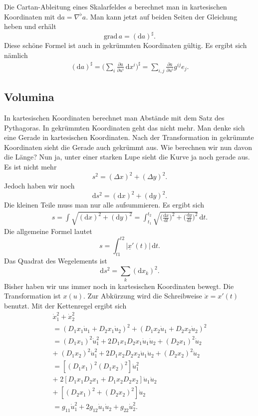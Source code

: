 \documentclass[a4paper,10pt,fleqn,twocolumn,twoside]{article}
\begin{document}
Die Cartan-Ableitung eines Skalarfeldes $a$ berechnet man in
kartesischen Koordinaten mit
$\mathrm da = \nabla^\flat a$. 
Man kann jetzt auf beiden Seiten der Gleichung heben und erhält
\[\mathrm{grad}\,a = (\mathrm da)^\sharp.\]
Diese schöne Formel ist auch in gekrümmten Koordinaten gültig.
Es ergibt sich nämlich
\begin{gather*}
(\mathrm da)^\sharp
= \Big(\sum_i \frac{\partial a}{\partial u^i}
\,\mathrm dx^i\Big)^\sharp
= \sum_{i,j} \frac{\partial a}{\partial u^i}g^{ij}e_j.
\end{gather*}

\subsection{Volumina}

In kartesischen Koordinaten berechnet man Abstände mit dem Satz des
Pythagoras. In gekrümmten Koordinaten geht das nicht mehr. Man denke
sich eine Gerade in kartesischen Koordinaten. Nach der Transformation
in gekrümmte Koordinaten sieht die Gerade auch gekrümmt aus. Wie
berechnen wir nun davon die Länge? Nun ja, unter einer starken Lupe
sieht die Kurve ja noch gerade aus. Es ist nicht mehr
\[s^2 = (\Delta x)^2+(\Delta y)^2.\]
Jedoch haben wir noch
\[\mathrm ds^2 = (\mathrm dx)^2+(\mathrm dy)^2.\]
Die kleinen Teile muss man nur alle aufsummieren. Es ergibt sich
\begin{gather*}
s = \int \sqrt{(\mathrm dx)^2+(\mathrm dy)^2}
= \int_{t_1}^{t_2}\sqrt{\Big(\frac{\mathrm dx}{\mathrm dt}\Big)^2
+\Big(\frac{\mathrm dy}{\mathrm dt}\Big)^2}\,\mathrm dt.
\end{gather*}
Die allgemeine Formel lautet
\[s = \int_{t1}^{t2} |\underline x'(t)|\,\mathrm dt.\]
Das Quadrat des Wegelements ist
\[\mathrm ds^2 = \sum_k (\mathrm dx_k)^2.\]
Bisher haben wir uns immer noch in kartesischen Koordinaten bewegt.
Die Transformation ist $x(u)$. Zur Abkürzung wird die Schreibweise
$\dot x=x'(t)$ benutzt. Mit der Kettenregel ergibt sich
\begin{gather*}
\dot x_1^2+\dot x_2^2\\
= (D_1x_1\dot u_1+D_2x_1\dot u_2)^2
+ (D_1x_2\dot u_1+D_2x_2\dot u_2)^2\\
= (D_1x_1)^2\dot u_1^2+2D_1x_1D_2x_1\dot u_1\dot u_2
+ (D_2x_1)^2\dot u_2\\
+\; (D_1x_2)^2\dot u_1^2+2D_1x_2D_2x_2\dot u_1\dot u_2
+ (D_2x_2)^2\dot u_2\\
= [(D_1x_1)^2(D_1x_2)^2]\dot u_1^2\\
+\; 2[D_1x_1D_2x_1+D_1x_2D_2x_2]\dot u_1\dot u_2\\
+\; [(D_2x_1)^2+(D_2x_2)^2]\dot u_2\\
= g_{11}\dot u_1^2+2g_{12}\dot u_1\dot u_2+g_{22}\dot u_2^2.
\end{gather*}
\end{document}
